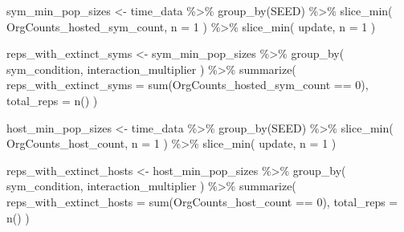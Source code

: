 \documentclass[
]{book}
\newenvironment{Shaded}{\begin{snugshade}}{\end{snugshade}}
\newcommand{\AttributeTok}[1]{\textcolor[rgb]{0.77,0.63,0.00}{#1}}
\newcommand{\DecValTok}[1]{\textcolor[rgb]{0.00,0.00,0.81}{#1}}
\newcommand{\FunctionTok}[1]{\textcolor[rgb]{0.00,0.00,0.00}{#1}}
\newcommand{\NormalTok}[1]{#1}
\newcommand{\OtherTok}[1]{\textcolor[rgb]{0.56,0.35,0.01}{#1}}
\newcommand{\SpecialCharTok}[1]{\textcolor[rgb]{0.00,0.00,0.00}{#1}}
\begin{document}
\begin{Shaded}
\begin{Highlighting}[]
\NormalTok{sym\_min\_pop\_sizes }\OtherTok{\textless{}{-}}\NormalTok{ time\_data }\SpecialCharTok{\%\textgreater{}\%}
  \FunctionTok{group\_by}\NormalTok{(SEED) }\SpecialCharTok{\%\textgreater{}\%}
  \FunctionTok{slice\_min}\NormalTok{(}
\NormalTok{    OrgCounts\_hosted\_sym\_count,}
    \AttributeTok{n =} \DecValTok{1}
\NormalTok{  ) }\SpecialCharTok{\%\textgreater{}\%}
  \FunctionTok{slice\_min}\NormalTok{(}
\NormalTok{    update,}
    \AttributeTok{n =} \DecValTok{1}
\NormalTok{  )}

\NormalTok{reps\_with\_extinct\_syms }\OtherTok{\textless{}{-}}\NormalTok{ sym\_min\_pop\_sizes }\SpecialCharTok{\%\textgreater{}\%}
  \FunctionTok{group\_by}\NormalTok{(}
\NormalTok{    sym\_condition,}
\NormalTok{    interaction\_multiplier}
\NormalTok{  ) }\SpecialCharTok{\%\textgreater{}\%}
  \FunctionTok{summarize}\NormalTok{(}
    \AttributeTok{reps\_with\_extinct\_syms =} \FunctionTok{sum}\NormalTok{(OrgCounts\_hosted\_sym\_count }\SpecialCharTok{==} \DecValTok{0}\NormalTok{),}
    \AttributeTok{total\_reps =} \FunctionTok{n}\NormalTok{()}
\NormalTok{  )}

\NormalTok{host\_min\_pop\_sizes }\OtherTok{\textless{}{-}}\NormalTok{ time\_data }\SpecialCharTok{\%\textgreater{}\%}
  \FunctionTok{group\_by}\NormalTok{(SEED) }\SpecialCharTok{\%\textgreater{}\%}
  \FunctionTok{slice\_min}\NormalTok{(}
\NormalTok{    OrgCounts\_host\_count,}
    \AttributeTok{n =} \DecValTok{1}
\NormalTok{  ) }\SpecialCharTok{\%\textgreater{}\%}
  \FunctionTok{slice\_min}\NormalTok{(}
\NormalTok{    update,}
    \AttributeTok{n =} \DecValTok{1}
\NormalTok{  )}

\NormalTok{reps\_with\_extinct\_hosts }\OtherTok{\textless{}{-}}\NormalTok{ host\_min\_pop\_sizes }\SpecialCharTok{\%\textgreater{}\%}
  \FunctionTok{group\_by}\NormalTok{(}
\NormalTok{    sym\_condition,}
\NormalTok{    interaction\_multiplier}
\NormalTok{  ) }\SpecialCharTok{\%\textgreater{}\%}
  \FunctionTok{summarize}\NormalTok{(}
    \AttributeTok{reps\_with\_extinct\_hosts =} \FunctionTok{sum}\NormalTok{(OrgCounts\_host\_count }\SpecialCharTok{==} \DecValTok{0}\NormalTok{),}
    \AttributeTok{total\_reps =} \FunctionTok{n}\NormalTok{()}
\NormalTok{  )}


\end{Highlighting}
\end{Shaded}
\end{document}
